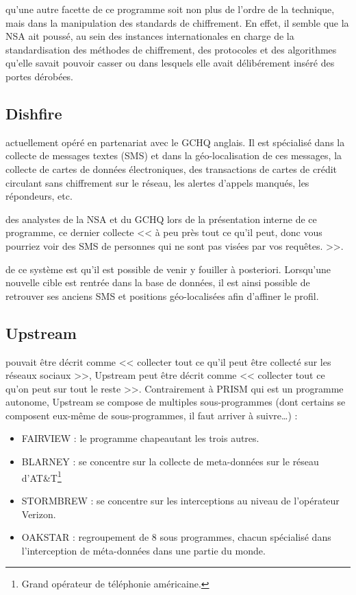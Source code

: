  qu'une autre facette de ce programme soit non
plus de l'ordre de la technique, mais dans la manipulation des standards de
chiffrement. En effet, il semble que la NSA ait poussé, au sein des instances
internationales en charge de la standardisation des méthodes de chiffrement, des
protocoles et des algorithmes qu'elle savait pouvoir casser\autocite{NYTenc} ou dans
lesquels elle avait délibérement inséré des portes dérobées.

\subsection{Dishfire}

 actuellement opéré en partenariat avec le GCHQ
anglais. Il est spécialisé dans la collecte de messages textes (SMS) et dans la
géo-localisation de ces messages, la collecte de cartes de données
électroniques, des transactions de cartes de crédit circulant sans chiffrement sur le réseau,
les alertes d'appels manqués, les répondeurs, etc.

 des analystes de la NSA et du GCHQ lors de la
présentation interne de ce programme, ce dernier collecte << à peu près tout ce
qu'il peut, donc vous pourriez voir des SMS de personnes qui ne sont pas visées
par vos requêtes. >>\autocite{Guardian}.

 de ce système est qu'il est possible de venir y
fouiller à posteriori. Lorsqu'une nouvelle cible est rentrée dans la base de
données, il est ainsi possible de retrouver ses anciens SMS et positions
géo-localisées afin d'affiner le profil.

\subsection{Upstream}

 pouvait être décrit comme << collecter tout ce qu'il
peut être collecté sur les réseaux sociaux >>, Upstream peut être décrit comme
<< collecter tout ce qu'on peut sur tout le reste >>. Contrairement à PRISM qui
est un programme autonome, Upstream se compose de multiples sous-programmes
(dont certains se composent eux-même de sous-programmes, il faut arriver à
suivre\ldots) :

\begin{itemize}
  \item FAIRVIEW : le programme chapeautant les trois autres.
  \item BLARNEY : se concentre sur la collecte de meta-données sur le réseau
  d'AT\&T\footnote{Grand opérateur de téléphonie américaine.}
  \item STORMBREW : se concentre sur les interceptions au niveau de l'opérateur
  Verizon.
  \item OAKSTAR : regroupement de 8 sous programmes, chacun spécialisé dans
  l'interception de méta-données dans une partie du monde.
\end{itemize}

